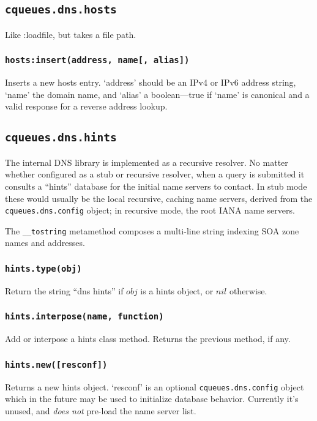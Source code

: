 \documentclass[11pt, oneside]{memoir}
\newcommand{\routine}[1]{\texttt{#1} }
\newcommand{\fn}[1]{\texttt{#1} }
\newcommand{\module}[1]{\texttt{#1} }
\newcounter{toccols}
\newenvironment{Module}[1]{
	\subsection{\texttt{#1}}
	\addtocontents{toc}{
		\protect\begin{multicols}{\value{toccols}}
	}
}{
	\addtocontents{toc}{\protect\end{multicols}}
}
\begin{document}
\begin{Module}{cqueues.dns.hosts}
Like :loadfile, but takes a file path.

\subsubsection[\fn{hosts:insert}]{\fn{hosts:insert(address, name[, alias])}}

Inserts a new hosts entry. `address' should be an IPv4 or IPv6 address string, `name' the domain name, and `alias' a boolean---true if `name' is canonical and a valid response for a reverse address lookup.

\end{Module}


\begin{Module}{cqueues.dns.hints}

The internal DNS library is implemented as a recursive resolver. No matter whether configured as a stub or recursive resolver, when a query is submitted it consults a ``hints'' database for the initial name servers to contact. In stub mode these would usually be the local recursive, caching name servers, derived from the \module{cqueues.dns.config} object; in recursive mode, the root IANA name servers.

The \fn{\_\_tostring} metamethod composes a multi-line string indexing SOA zone names and addresses.

\subsubsection[\routine{hints.type}]{\routine{hints.type(obj)}}
Return the string ``dns hints'' if $obj$ is a hints object, or $nil$ otherwise.

\subsubsection[\fn{hints.interpose}]{\fn{hints.interpose(name, function)}}

Add or interpose a hints class method. Returns the previous method, if any.

\subsubsection[\fn{hints.new}]{\fn{hints.new([resconf])}}

Returns a new hints object. `resconf' is an optional \module{cqueues.dns.config} object which in the future may be used to initialize database behavior. Currently it's unused, and \emph{does not} pre-load the name server list.


\end{Module}
\end{document}
